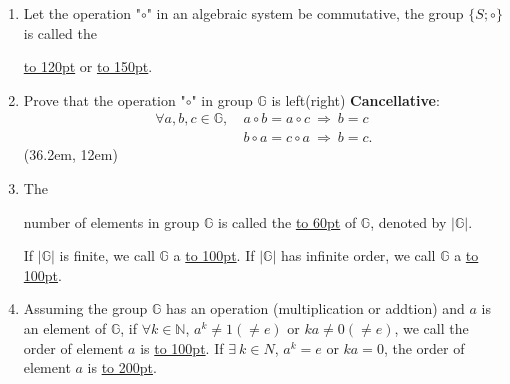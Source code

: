 \documentclass[12pt]{scrartcl}
\begin{document}
{{\begin{enumerate}[label=(\alph*)]
		\begin{itemize}[leftmargin=50pt]
		\item $\forall a \in S, ~ \exists ~ a^{-1} \in S$, so $a^{-1} \circ a = e$;
		\item $\forall a \in S, ~ \exists ~ e \in S$, so $a \circ e = a$.\\
		\end{itemize} 
		\framebox(36.2em, 15em){}


	\item Let the operation "$\circ$" in an algebraic system be commutative, the group $\{S; \circ\}$ is called the \rule{0pt}{15pt}\underline{\hbox to 120pt{}} or \underline{\hbox to 150pt{}}. \\


	\item Prove that the operation "$\circ$" in group $\mathbb{G}$ is left(right) \textbf{Cancellative}: 
	\begin{align*}
	\forall a, b, c \in \mathbb{G}, ~ &a \circ b = a \circ c ~ \Longrightarrow ~ b = c \\
	&b \circ a = c \circ a ~ \Longrightarrow ~ b = c.
	\end{align*}
	\framebox(36.2em, 12em){} \\

	\item The \rule{0pt}{20pt}number of elements in group $\mathbb{G}$ is called the \underline{\hbox to 60pt{}} of $\mathbb{G}$, denoted by $|\mathbb{G}|$. 

	\begin{spacing}{1.2}If $|\mathbb{G}|$ is finite, we call $\mathbb{G}$ a \underline{\hbox to 100pt{}}.  If $|\mathbb{G}|$ has infinite order, we call $\mathbb{G}$ a \underline{\hbox to 100pt{}}.\end{spacing}

	\item \begin{spacing}{1.2}Assuming the group $\mathbb{G}$ has an operation (multiplication or addtion) and $a$ is an element of $\mathbb{G}$, if $\forall k \in \mathbb{N}$, $a^{k} \neq 1 (\neq e)$ or $ka \neq 0 (\neq e)$, we call the order of element $a$ is \underline{\hbox to 100pt{}}. If $\exists ~ k \in N$, $a^{k} = e$ or $ka = 0$, the order of element $a$ is \underline{\hbox to 200pt{}}. \end{spacing}


	\end{enumerate}


\newpage

}}
\end{document}
